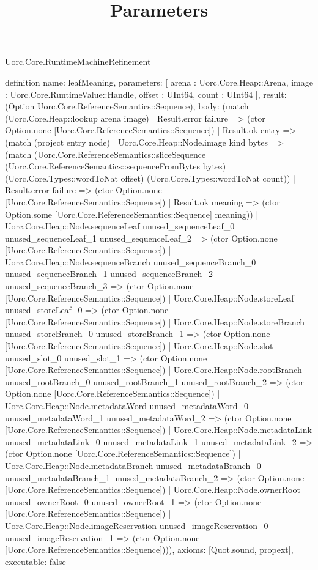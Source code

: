 \begin{lexlean}{Uorc.Core.RuntimeMachineRefinement}
\title{Parameters}
\begin{semanticmodule}
definition{
  name: leafMeaning,
  parameters: [
    arena : Uorc.Core.Heap::Arena,
    image : Uorc.Core.RuntimeValue::Handle,
    offset : UInt64,
    count : UInt64
  ],
  result: (Option Uorc.Core.ReferenceSemantics::Sequence),
  body: (match (Uorc.Core.Heap::lookup arena image)
    | Result.error failure => (ctor Option.none [Uorc.Core.ReferenceSemantics::Sequence])
    | Result.ok entry => (match (project entry node)
      | Uorc.Core.Heap::Node.image kind bytes => (match (Uorc.Core.ReferenceSemantics::sliceSequence (Uorc.Core.ReferenceSemantics::sequenceFromBytes bytes) (Uorc.Core.Types::wordToNat offset) (Uorc.Core.Types::wordToNat count))
        | Result.error failure => (ctor Option.none [Uorc.Core.ReferenceSemantics::Sequence])
        | Result.ok meaning => (ctor Option.some [Uorc.Core.ReferenceSemantics::Sequence] meaning))
      | Uorc.Core.Heap::Node.sequenceLeaf unused_sequenceLeaf_0 unused_sequenceLeaf_1 unused_sequenceLeaf_2 => (ctor Option.none [Uorc.Core.ReferenceSemantics::Sequence])
      | Uorc.Core.Heap::Node.sequenceBranch unused_sequenceBranch_0 unused_sequenceBranch_1 unused_sequenceBranch_2 unused_sequenceBranch_3 => (ctor Option.none [Uorc.Core.ReferenceSemantics::Sequence])
      | Uorc.Core.Heap::Node.storeLeaf unused_storeLeaf_0 => (ctor Option.none [Uorc.Core.ReferenceSemantics::Sequence])
      | Uorc.Core.Heap::Node.storeBranch unused_storeBranch_0 unused_storeBranch_1 => (ctor Option.none [Uorc.Core.ReferenceSemantics::Sequence])
      | Uorc.Core.Heap::Node.slot unused_slot_0 unused_slot_1 => (ctor Option.none [Uorc.Core.ReferenceSemantics::Sequence])
      | Uorc.Core.Heap::Node.rootBranch unused_rootBranch_0 unused_rootBranch_1 unused_rootBranch_2 => (ctor Option.none [Uorc.Core.ReferenceSemantics::Sequence])
      | Uorc.Core.Heap::Node.metadataWord unused_metadataWord_0 unused_metadataWord_1 unused_metadataWord_2 => (ctor Option.none [Uorc.Core.ReferenceSemantics::Sequence])
      | Uorc.Core.Heap::Node.metadataLink unused_metadataLink_0 unused_metadataLink_1 unused_metadataLink_2 => (ctor Option.none [Uorc.Core.ReferenceSemantics::Sequence])
      | Uorc.Core.Heap::Node.metadataBranch unused_metadataBranch_0 unused_metadataBranch_1 unused_metadataBranch_2 => (ctor Option.none [Uorc.Core.ReferenceSemantics::Sequence])
      | Uorc.Core.Heap::Node.ownerRoot unused_ownerRoot_0 unused_ownerRoot_1 => (ctor Option.none [Uorc.Core.ReferenceSemantics::Sequence])
      | Uorc.Core.Heap::Node.imageReservation unused_imageReservation_0 unused_imageReservation_1 => (ctor Option.none [Uorc.Core.ReferenceSemantics::Sequence]))),
  axioms: [Quot.sound, propext],
  executable: false
}


\end{semanticmodule}
\end{lexlean}
